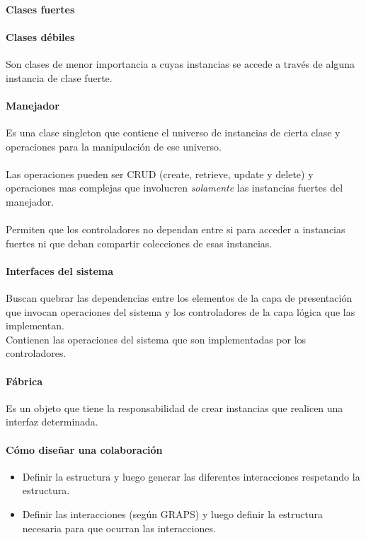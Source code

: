 \documentclass[a4paper,12pt,oneside]{report}
\begin{document}
        \paragraph{Clases fuertes}

        \paragraph{Clases d\'ebiles}
          Son clases de menor importancia a cuyas instancias se accede a
          trav\'es de alguna instancia de clase fuerte.

        \paragraph{Manejador}
          Es una clase singleton que contiene el universo de instancias de cierta
          clase y operaciones para la manipulaci\'on de ese universo.\\
          \\
          Las operaciones pueden ser CRUD (create, retrieve, update y delete)
          y operaciones mas complejas que involucren \emph{solamente} las
          instancias fuertes del manejador.\\
          \\
          Permiten que los controladores no dependan entre si para acceder a instancias
          fuertes ni que deban compartir colecciones de esas instancias.

        \paragraph{Interfaces del sistema}
          Buscan quebrar las dependencias entre los elementos de la capa de
          presentaci\'on que invocan operaciones del sistema y los controladores
          de la capa l\'ogica que las implementan.\\
          Contienen las operaciones del sistema que son implementadas por los controladores.

        \paragraph{F\'abrica}
          Es un objeto que tiene la responsabilidad de crear instancias que realicen una
          interfaz determinada.

        \paragraph{C\'omo dise\~nar una colaboraci\'on}
          \begin{itemize}
            \item Definir la estructura y luego generar las diferentes
                  interacciones respetando la estructura.
            \item Definir las interacciones (seg\'un GRAPS) y luego definir la
                  estructura necesaria para que ocurran las interacciones.
          \end{itemize}
\end{document}
